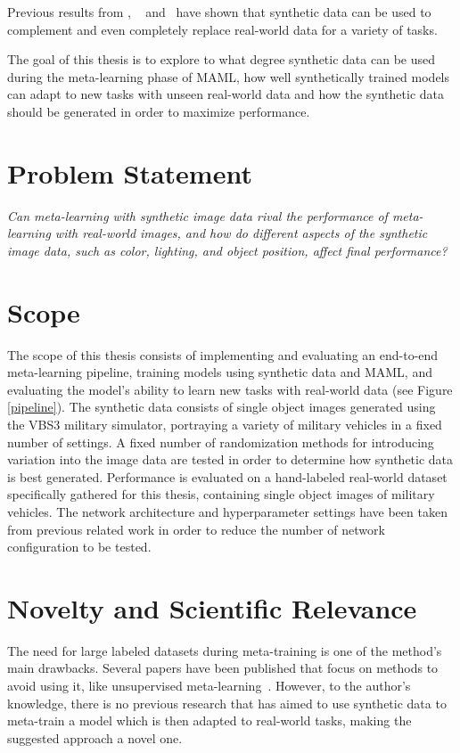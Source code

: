 Previous results from \textcite{domainrandcars}, ~\textcite{structureddomainrandomization} and~\textcite{domainrand} have shown that synthetic data can be used to complement and even completely replace real-world data for a variety of tasks.

The goal of this thesis is to explore to what degree synthetic data can be used during the meta-learning phase of \gls{MAML}, how well synthetically trained models can adapt to new tasks with unseen real-world data and how the synthetic data should be generated in order to maximize performance.

\section{Problem Statement}

\textit{Can meta-learning with synthetic image data rival the performance of meta-learning with real-world images, and how do different aspects of the synthetic image data, such as color, lighting, and object position, affect final performance?}


\section{Scope}
The scope of this thesis consists of implementing and evaluating an end-to-end meta-learning pipeline, training models using synthetic data and \gls{MAML}, and evaluating the model's ability to learn new tasks with real-world data (see Figure \ref{pipeline}). The synthetic data consists of single object images generated using the \gls{VBS3} military simulator, portraying a variety of military vehicles in a fixed number of settings. A fixed number of randomization methods for introducing variation into the image data are tested in order to determine how synthetic data is best generated. Performance is evaluated on a hand-labeled real-world dataset specifically gathered for this thesis, containing single object images of military vehicles.  The network architecture and hyperparameter settings have been taken from previous related work in order to reduce the number of network configuration to be tested.

\section{Novelty and Scientific Relevance}
The need for large labeled datasets during meta-training is one of the method's main drawbacks. Several papers have been published that focus on methods to avoid using it, like unsupervised meta-learning~\cite{unsup-maml, unsup-maml-rand}. However, to the author's knowledge, there is no previous research that has aimed to use synthetic data to meta-train a model which is then adapted to real-world tasks, making the suggested approach a novel one.

